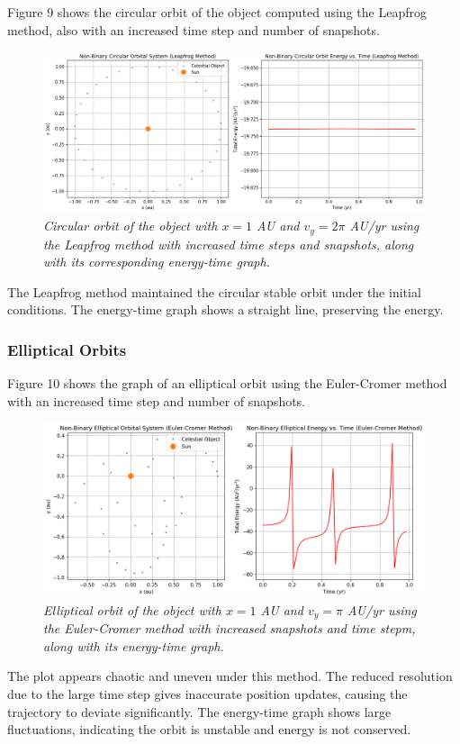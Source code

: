 \documentclass[11 pt, a4paper, twocolumn]{article}
\begin{document}
Figure 9 shows the circular orbit of the object computed using the Leapfrog method, also with an increased
time step and number of snapshots.
\begin{figure}[H]
  \includegraphics[width=1\linewidth]{Leapfrog/leapfrogcircularincrease.png}
  \centering
  \caption{\textit{Circular orbit of the object with $x = 1$ AU and $v_y = 2\pi$ AU/yr using the 
  Leapfrog method with increased time steps and snapshots, along with its corresponding energy-time graph.}} 
\end{figure}
\vspace{-1em}
The Leapfrog method maintained the circular stable orbit under the initial conditions. The energy-time
graph shows a straight line, preserving the energy.

\subsubsection{Elliptical Orbits}
Figure 10 shows the graph of an elliptical orbit using the Euler-Cromer method with an increased time
step and number of snapshots.
\begin{figure}[H]
  \includegraphics[width=1\linewidth]{Euler cromer/eulercromerellipticincrease.png}
  \centering
  \caption{\textit{Elliptical orbit of the object with $x = 1$ AU and $v_y = \pi$ AU/yr using the 
  Euler-Cromer method with increased snapshots and time stepm, along with its energy-time graph.}} 
\end{figure}
\vspace{-1em}
The plot appears chaotic and uneven under this method. The reduced resolution due to the large time step
gives inaccurate position updates, causing the trajectory to deviate significantly. The energy-time graph
shows large fluctuations, indicating the orbit is unstable and energy is not conserved.
\end{document}
